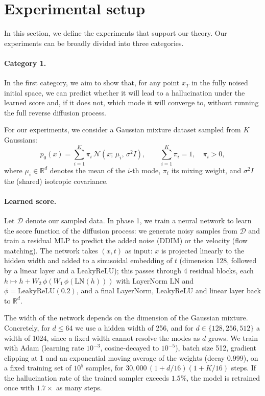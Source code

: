 \section{Experimental setup}
In this section, we define the experiments that support our theory. Our experiments can be
broadly divided into three categories.

\paragraph{Category 1.}
In the first category, we aim to show that, for any point $x_T$ in the fully noised initial
space, we can predict whether it will lead to a hallucination under the learned score and, if it
does not, which mode it will converge to, without running the full reverse diffusion process.

For our experiments, we consider a Gaussian mixture dataset sampled from $K$ Gaussians:
\begin{equation}
    p_0(x) = \sum_{i=1}^{K} \pi_i \, \mathcal{N}\!\left(x;\, \mu_i,\, \sigma^2 I\right), \qquad \sum_{i=1}^{K} \pi_i = 1, \quad \pi_i > 0,
\end{equation}
where $\mu_i \in \mathbb{R}^d$ denotes the mean of the $i$-th mode, $\pi_i$ its mixing weight,
and $\sigma^2 I$ the (shared) isotropic covariance.

\paragraph{Learned score.}
Let $\mathcal{D}$ denote our sampled data. In phase 1, we train a neural network to learn the
score function of the diffusion process: we generate noisy samples from $\mathcal{D}$ and train
a residual MLP to predict the added noise (DDIM) or the velocity (flow matching). The network
takes $(x, t)$ as input: $x$ is projected linearly to the hidden width and added to a sinusoidal
embedding of $t$ (dimension 128, followed by a linear layer and a LeakyReLU); this passes through
4 residual blocks, each $h \mapsto h + W_2\,\phi(W_1\,\phi(\mathrm{LN}(h)))$ with LayerNorm
$\mathrm{LN}$ and $\phi = \mathrm{LeakyReLU}(0.2)$, and a final LayerNorm, LeakyReLU and linear
layer back to $\mathbb{R}^d$.

The width of the network depends on the dimension of the Gaussian mixture. Concretely, for
$d \le 64$ we use a hidden width of 256, and for $d \in \{128, 256, 512\}$ a width of 1024,
since a fixed width cannot resolve the modes as $d$ grows. We train with Adam (learning rate
$10^{-3}$, cosine-decayed to $10^{-5}$), batch size 512, gradient clipping at 1 and an
exponential moving average of the weights (decay 0.999), on a fixed training set of $10^5$
samples, for $30{,}000\,(1 + d/16)(1 + K/16)$ steps. If the hallucination rate of the trained
sampler exceeds $1.5\%$, the model is retrained once with $1.7\times$ as many steps.

